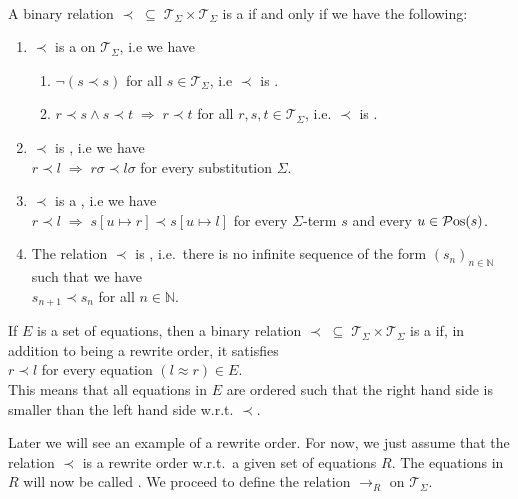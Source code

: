 \begin{Definition} \hspace*{\fill} \\
  A binary relation $\prec \;\subseteq\; \mathcal{T}_\Sigma \times \mathcal{T}_\Sigma$ is a
   if and only if we have the following:
  \begin{enumerate}
  \item $\prec$ is a  on $\mathcal{T}_\Sigma$, i.e we have
        \begin{enumerate}
        \item $\neg (s \prec s)$ \hspace*{2.6cm} for all $s \in \mathcal{T}_\Sigma$, i.e $\prec$ is .
        \item $r \prec s \wedge s \prec t \;\Rightarrow\; r \prec t$ \quad for all $r,s,t \in \mathcal{T}_\Sigma$,
              i.e. $\prec$ is . 
        \end{enumerate}
    
  \item $\prec$ is , i.e we have
        \\[0.2cm]
        \hspace*{1.3cm}
        $r \prec l \;\Rightarrow\; r\sigma \prec l\sigma$ \quad for every substitution $\Sigma$.
  \item $\prec$ is a , i.e we have
        \\[0.2cm]
        \hspace*{1.3cm}
        $r \prec l \;\Rightarrow\; s[u \mapsto r] \prec s[u \mapsto l]$ for every $\Sigma$-term $s$ and every
        $u \in\mathcal{P}\mathrm{os}(s)  $.
  \item The relation $\prec$ is , i.e.~there is no infinite sequence of the form
        $(s_n)_{n\in\mathbb{N}}$ such that we have
        \\[0.2cm]
        \hspace*{1.3cm}
        $s_{n+1} \prec s_n$ \quad for all $n \in \mathbb{N}$. 
  \end{enumerate}
  If $E$ is a set of equations, then a binary relation $\prec \;\subseteq\; \mathcal{T}_\Sigma \times \mathcal{T}_\Sigma$
  is a  if, in addition to being a rewrite order, it satisfies
  \\[0.2cm]
  \hspace*{1.3cm}
  $r \prec l$ \quad for every equation $(l \approx r) \in E$.
  \\[0.2cm]    
  This means that all equations in $E$ are ordered such that the right hand side is smaller than the left
  hand side w.r.t. $\prec$.    \eod
\end{Definition}
Later we will see an example of a rewrite order.  For now, we just assume that 
the relation $\prec$ is a rewrite order w.r.t.~a given set of equations $R$.  The equations in $R$ will now be called
.  We proceed to define the relation $\rightarrow_R$ on $\mathcal{T}_\Sigma$.

